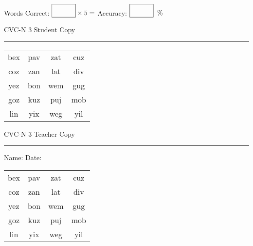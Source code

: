 \documentclass{memoir}
\begin{document}
\small

Words Correct: $\fbox{\phantom{\huge 100}} \times 5 = $ Accuracy: $\fbox{\phantom{\huge 100}}\;\; \%$ 

\vfill

\newpage


\footnotesize \noindent
CVC-N 3 \hfill Student Copy
\smallskip
\hrule

\Large

\setlength{\tabcolsep}{14pt}
\def\arraystretch{2}

{\selectfont


\begin{vplace}[0.5]
\begin{center}
\begin{tabular}{cccc}
bex & pav & zat & cuz \\
coz & zan & lat & div \\
yez & bon & wem & gug \\
goz & kuz & puj & mob \\
lin & yix & weg & yil \\
\end{tabular}
\end{center}
\end{vplace}

}

\newpage

\footnotesize \noindent
CVC-N 3 \hfill Teacher Copy
\smallskip
\hrule

\small

\vfill

\noindent
Name: \underline{\hspace{1.75in}} \hfill Date: \underline{\hspace{1in}}

\Large

{\selectfont


\begin{vplace}[0.5]
\begin{center}
\begin{tabular}{cccc}
bex & pav & zat & cuz \\
coz & zan & lat & div \\
yez & bon & wem & gug \\
goz & kuz & puj & mob \\
lin & yix & weg & yil \\
\end{tabular}
\end{center}
\end{vplace}



}
\end{document}
